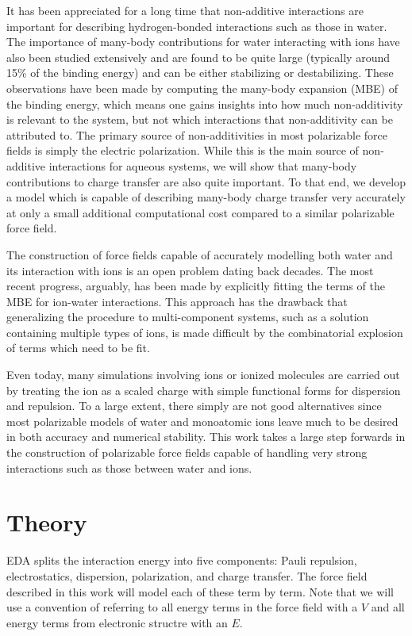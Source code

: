\documentclass[journal=jacsat,manuscript=article]{achemso}
\begin{document}
It has been appreciated for a long time that non-additive interactions are
important for describing hydrogen-bonded interactions such as those in water.\cite{xantheas2000cooperativity}
The importance of many-body contributions for water interacting with ions have
also been studied extensively and are found to be quite large (typically around 15\% of the binding energy)
and can be either stabilizing or destabilizing.\cite{heindel2021many,herman2021many}
These observations have been made by computing the many-body expansion (MBE) of
the binding energy\cite{heindel2020many}, which means one gains insights into how much non-additivity
is relevant to the system, but not which interactions that non-additivity can be
attributed to. The primary source of non-additivities in most polarizable force fields
is simply the electric polarization. While this is the main source of non-additive
interactions for aqueous systems, we will show that many-body contributions to charge
transfer are also quite important. To that end, we develop a model which is capable
of describing many-body charge transfer very accurately at only a small additional
computational cost compared to a similar polarizable force field.

The construction of force fields capable of accurately modelling both water and
its interaction with ions is an open problem dating back decades. The most recent
progress, arguably, has been made by explicitly fitting the terms of the MBE for
ion-water interactions.\cite{zhuang2022hydration,caruso2022accurate} This approach
has the drawback that generalizing the procedure to multi-component systems,
such as a solution containing multiple types of ions, is made difficult by
the combinatorial explosion of terms which need to be fit.

Even today, many simulations involving ions or ionized molecules are carried out by treating the
ion as a scaled charge with simple functional forms for dispersion and repulsion.\cite{leontyev2011accounting,bedrov2019molecular}
To a large extent, there simply are not good alternatives since most polarizable
models of water and monoatomic ions leave much to be desired in both accuracy and
numerical stability. This work takes a large step forwards in the construction of
polarizable force fields capable of handling very strong interactions such as those
between water and ions.

\section{Theory}
EDA splits the interaction energy into five components: Pauli repulsion,
electrostatics, dispersion, polarization, and charge transfer. The force
field described in this work will model each of these term by term.
Note that we will use a convention of referring to all energy
terms in the force field with a $V$ and all energy terms from electronic structre
with an $E$.
\end{document}
